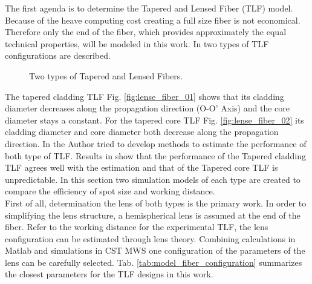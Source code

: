 
The first agenda is to determine the Tapered and Lensed Fiber (TLF) model. Because of the heave computing cost creating a full size fiber is not economical. Therefore only the end of the fiber, which provides approximately the equal technical properties, will be modeled in this work. In \cite{TLF_analysis,TLF_mode_transforming} two types of TLF configurations are described.\\ 

\begin{figure}[!ht]
\centering
{}
\hfill
{}
\label{fig:two_TLF}
\caption{Two types of Tapered and Lensed Fibers.}
\end{figure}
The tapered cladding TLF Fig. \ref{fig:lense_fiber_01} shows that its cladding diameter decreases along the propagation direction (O-O' Axis) and the core diameter stays a constant. For the tapered core TLF Fig. \ref{fig:lense_fiber_02} its cladding diameter and core diameter both decrease along the propagation direction. In \cite{TLF_mode_transforming} the Author tried to develop methods to estimate the performance of both type of TLF. Results in \cite{TLF_mode_transforming} show that the performance of the Tapered cladding TLF agrees well with the estimation and that of the Tapered core TLF is unpredictable. In this section two simulation models of each type are created to compare the efficiency of spot size and working distance.\\  

First of all, determination the lens of both types is the primary work. In order to simplifying the lens structure, a hemispherical lens is assumed at the end of the fiber. Refer to the working distance for the experimental TLF, the lens configuration can be estimated through lens theory. Combining calculations in Matlab and simulations in CST MWS one configuration of the parameters of the lens can be carefully selected. Tab. \ref{tab:model_fiber_configuration} summarizes the closest parameters for the TLF designs in this work.\\   

